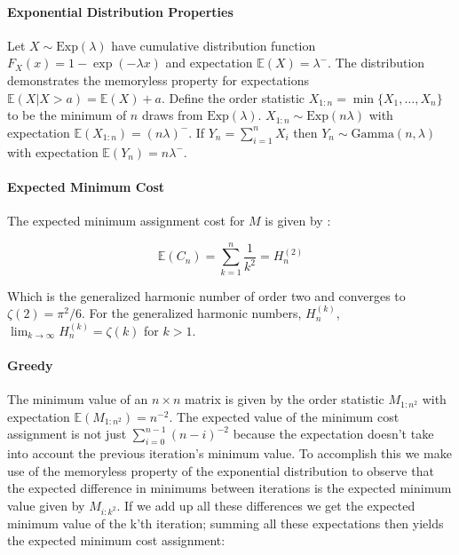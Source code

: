 \documentclass{article}
\newcommand{\expected}[1]{\mathbb{E} \left ( #1 \right )}
\newcommand{\exprv}[1]{\text{Exp} \left( #1 \right )}
\begin{document}
\paragraph{Exponential Distribution Properties}

Let $X \sim \exprv{\lambda}$ have cumulative distribution function $F_X(x) = 1 - \exp{\left(-\lambda x\right)}$ and expectation $\expected{X} = \lambda^{-}$. The distribution demonstrates the memoryless property for expectations $\expected{X \lvert X > a} = \expected{X} + a$. Define the order statistic $X_{1:n} = \min \lbrace X_{1}, \ldots, X_{n} \rbrace $ to be the minimum of $n$ draws from $\exprv{\lambda}$. $X_{1:n} \sim \exprv{n \lambda}$ \cite{balakrishnan2000handbook} with expectation $\expected{X_{1:n}} = \left(n \lambda\right)^-$. If $Y_n = \sum_{i = 1}^{n} X_i$ then $Y_n \sim \text{Gamma}(n, \lambda)$ with expectation $\expected{Y_n} = n \lambda^{-}$.

\paragraph{Expected Minimum Cost}

The expected minimum assignment cost for $M$ is given by \cite{aldous2001zeta}:

\begin{equation}
	\expected{C_n} = \sum_{k = 1}^{n} \frac{1}{k^2} = H_{n}^{(2)}
\end{equation}

Which is the generalized harmonic number of order two and converges to $\zeta(2) = \pi^2/6$. For the generalized harmonic numbers, $H_{n}^{(k)}$, $\lim_{k\to\infty} H_{n}^{(k)} = \zeta(k)$ for $k > 1$.

\paragraph{Greedy}

The minimum value of an $n \times n$ matrix is given by the order statistic $M_{1:n^2}$ with expectation $\expected{ M_{1:n^2} } = n^{-2}$. The expected value of the minimum cost assignment is not just $\sum_{i=0}^{n-1} (n-i)^{-2}$ because the expectation doesn't take into account the previous iteration's minimum value. To accomplish this we make use of the memoryless property of the exponential distribution to observe that the expected difference in minimums between iterations is the expected minimum value given by $M_{i:k^2}$. If we add up all these differences we get the expected minimum value of the k'th iteration; summing all these expectations then yields the expected minimum cost assignment:
\end{document}
